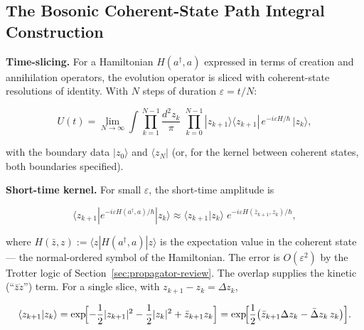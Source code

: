 \subsection{The Bosonic Coherent-State Path Integral Construction}

\medskip\noindent\textbf{Time-slicing.} For a Hamiltonian $H(a^{\dagger}, a)$ expressed in terms of creation and annihilation operators, the evolution operator is sliced with coherent-state resolutions of identity. With $N$ steps of duration $\varepsilon = t/N$:
\begin{linenomath}
\begin{equation}
U(t) = \lim_{N\to\infty} \int \prod_{k=1}^{N-1}\frac{d^{2}z_{k}}{\pi}\;
\prod_{k=0}^{N-1}|z_{k+1}\rangle\langle z_{k+1}|\,e^{-i\varepsilon H/\hbar}\,|z_{k}\rangle,
\label{eq:boson-time-slicing}
\end{equation}
\end{linenomath}
with the boundary data $|z_{0}\rangle$ and $\langle z_{N}|$ (or, for the kernel between coherent states, both boundaries specified).

\medskip\noindent\textbf{Short-time kernel.} For small $\varepsilon$, the short-time amplitude is
\begin{linenomath}
\begin{equation}
\langle z_{k+1}|e^{-i\varepsilon H(a^{\dagger},a)/\hbar}|z_{k}\rangle
\approx \langle z_{k+1}|z_{k}\rangle\;
e^{-i\varepsilon H(\bar z_{k+1},z_{k})/\hbar},
\label{eq:boson-short-time}
\end{equation}
\end{linenomath}
where $H(\bar z, z) := \langle z|H(a^{\dagger},a)|z\rangle$ is the expectation value in the coherent state --- the normal-ordered symbol of the Hamiltonian. The error is $O(\varepsilon^{2})$ by the Trotter logic of Section~\ref{sec:propagator-review}. The overlap supplies the kinetic (``$\bar z\dot z$'') term. For a single slice, with $z_{k+1} - z_{k} = \Delta z_{k}$,
\begin{linenomath}
\begin{equation}
\langle z_{k+1}|z_{k}\rangle
= \exp\!\Bigl[-\frac{1}{2}|z_{k+1}|^{2} - \frac{1}{2}|z_{k}|^{2} + \bar z_{k+1}z_{k}\Bigr]
= \exp\!\Bigl[\frac{1}{2}\bigl(\bar z_{k+1}\Delta z_{k} - \bar\Delta z_{k}\,z_{k}\bigr)\Bigr].
\label{eq:overlap-difference}
\end{equation}
\end{linenomath}

